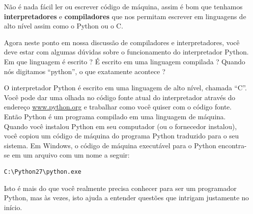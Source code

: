 Não é nada fácil ler ou escrever código de máquina, assim é bom que tenhamos
{\bf interpretadores} e {\bf compiladores} que nos permitam escrever em linguagens
de alto nível assim como o Python ou o C.
%

Agora neste ponto em nossa discussão de compiladores e interpretadores, você deve
estar com algumas dúvidas sobre o funcionamento do interpretador Python. Em que
linguagem é escrito ? É escrito em uma linguagem compilada ? Quando nós
digitamos ``python'', o que exatamente acontece ?
%

O interpretador Python é escrito em uma linguagem de alto nível, chamada ``C''.
Você pode dar uma olhada no código fonte atual do interpretador através
do endereço \url{www.python.org} e trabalhar como você quiser com o código fonte.
Então Python é um programa compilado em uma linguagem de máquina.
Quando você instalou Python em seu computador (ou o fornecedor instalou),
você copiou um código de máquina do programa Python traduzido para o seu sistema.
Em Windows, o código de máquina executável para o Python encontra-se em um
arquivo com um nome a seguir:
%

\beforeverb
\begin{verbatim}
C:\Python27\python.exe
\end{verbatim}
\afterverb

Isto é mais do que você realmente precisa conhecer para ser um programador Python, mas
às vezes, isto ajuda a entender questões que intrigam justamente no início.
%


